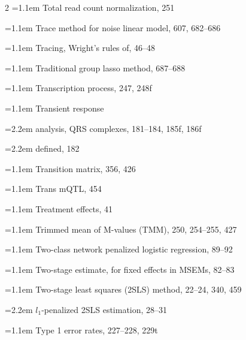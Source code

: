 \begin{multicols}{2}
\noindent\hangindent=1.1em Total read count normalization, 251\par
\noindent\hangindent=1.1em Trace method for noise linear model, 607, 682--686\par
\noindent\hangindent=1.1em Tracing, Wright's rules of, 46--48\par
\noindent\hangindent=1.1em Traditional group lasso method, 687--688\par
\noindent\hangindent=1.1em Transcription process, 247, 248f\par
\noindent\hangindent=1.1em Transient response\par
\noindent\hangindent=2.2em \hspace*{1.1em}analysis, QRS complexes, 181--184, 185f, 186f\par
\noindent\hangindent=2.2em \hspace*{1.1em}defined, 182\par
\noindent\hangindent=1.1em Transition matrix, 356, 426\par
\noindent\hangindent=1.1em Trans mQTL, 454\par
\noindent\hangindent=1.1em Treatment effects, 41\par
\noindent\hangindent=1.1em Trimmed mean of M-values (TMM), 250, 254--255, 427\par
\noindent\hangindent=1.1em Two-class network penalized logistic regression, 89--92\par
\noindent\hangindent=1.1em Two-stage estimate, for fixed effects in MSEMs, 82--83\par
\noindent\hangindent=1.1em Two-stage least squares (2SLS) method, 22--24, 340, 459\par
\noindent\hangindent=2.2em \hspace*{1.1em}$l_{1}$-penalized 2SLS estimation, 28--31\par
\noindent\hangindent=1.1em Type 1 error rates, 227--228, 229t\par


\end{multicols}
